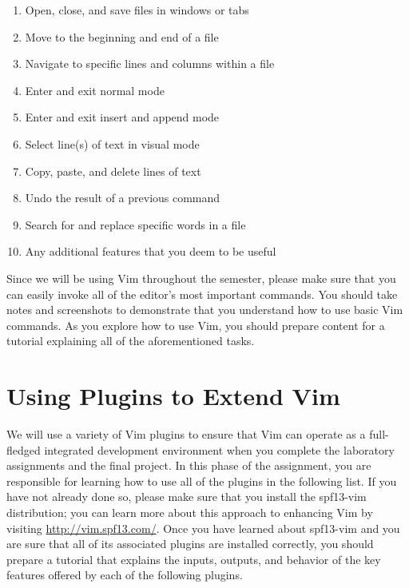 \vspace*{-.1in}
\begin{enumerate}
  \itemsep 0em

        \item Open, close, and save files in windows or tabs
        \item Move to the beginning and end of a file
        \item Navigate to specific lines and columns within a file
        \item Enter and exit normal mode
        \item Enter and exit insert and append mode
        \item Select line(s) of text in visual mode
        \item Copy, paste, and delete lines of text
        \item Undo the result of a previous command
        \item Search for and replace specific words in a file
        \item Any additional features that you deem to be useful

\end{enumerate}
\vspace*{-.1in}

Since we will be using Vim throughout the semester, please make sure that you can easily invoke all of the editor's most
important commands.  You should take notes and screenshots to demonstrate that you understand how to use basic
Vim commands. As you explore how to use Vim, you should prepare content for a tutorial explaining all of the
aforementioned tasks.

\section*{Using Plugins to Extend Vim}

We will use a variety of Vim plugins to ensure that Vim can operate as a full-fledged integrated development environment
when you complete the laboratory assignments and the final project.  In this phase of the assignment, you are
responsible for learning how to use all of the plugins in the following list.  If you have not already done so, please
make sure that you install the spf13-vim distribution; you can learn more about this approach to enhancing Vim by
visiting \url{http://vim.spf13.com/}.  Once you have learned about spf13-vim and you are sure that all of its associated
plugins are installed correctly, you should prepare a tutorial that explains the inputs, outputs, and behavior of the
key features offered by each of the following plugins.

